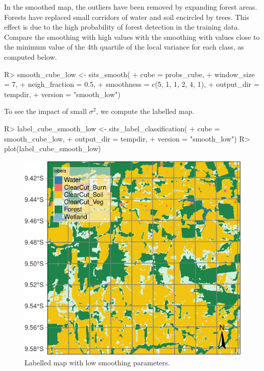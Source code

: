 \documentclass[
  shortnames]{jss}
\begin{document}
In the smoothed map, the outliers have been removed by expanding forest areas. Forests have replaced small corridors of water and soil encircled by trees. This effect is due to the high probability of forest detection in the training data. Compare the smoothing with high values with the smoothing with values close to the minimum value of the 4th quartile of the local variance for each class, as computed below.

\begin{CodeChunk}
\begin{CodeInput}
R> smooth_cube_low <- sits_smooth(
+     cube = probs_cube,
+     window_size = 7,
+     neigh_fraction = 0.5,
+     smoothness = c(5, 1, 1, 2, 4, 1),
+     output_dir = tempdir,
+     version = "smooth_low")
\end{CodeInput}
\end{CodeChunk}

To see the impact of small \(\sigma^2\), we compute the labelled map.

\begin{CodeChunk}
\begin{CodeInput}
R> label_cube_smooth_low <- sits_label_classification(
+     cube = smooth_cube_low,
+     output_dir = tempdir,
+     version = "smooth_low")
R> plot(label_cube_smooth_low)
\end{CodeInput}
\begin{figure}[h]

{\centering \includegraphics{Bayesian_smoothing_JSS_files/figure-latex/smth2-1} 

}

\caption[Labelled map with low smoothing parameters]{Labelled map with low smoothing parameters.}\label{fig:smth2}
\end{figure}
\end{CodeChunk}
\end{document}
